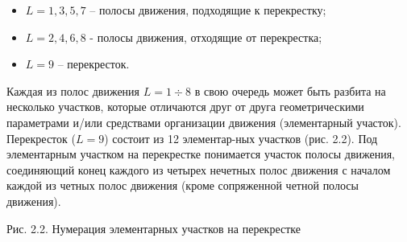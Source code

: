 \documentclass[a4paper,14pt]{article}
\begin{document}
\begin{itemize}
\item $L = 1, 3, 5, 7$ – полосы движения, подходящие к перекрестку;
\item $L = 2, 4, 6, 8$ - полосы движения, отходящие от перекрестка;
\item $L = 9$ – перекресток.
\end{itemize}
Каждая из полос движения $L=1 \div 8$ в свою очередь может быть разбита на несколько участков, которые отличаются друг от друга геометрическими параметрами и/или средствами организации движения (элементарный участок). Перекресток ($L=9$) состоит из 12 элементар-ных участков (рис. 2.2). Под элементарным участком на перекрестке понимается участок полосы движения, соединяющий конец каждого из четырех нечетных полос движения с началом каждой из четных полос движения (кроме сопряженной четной полосы движения).

Рис. 2.2. Нумерация элементарных участков на перекрестке

\end{document}
